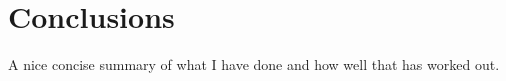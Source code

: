 \chapter{Conclusions}
\label{chapter:conclusions}

A nice concise summary of what I have done and how well that has worked out.